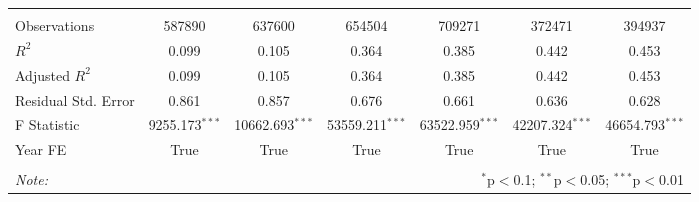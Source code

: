 \begin{tabular}{@{\extracolsep{5pt}}lcccccc}
\hline \\[-1.8ex]
 Observations & 587890 & 637600 & 654504 & 709271 & 372471 & 394937 \\
 $R^2$ & 0.099 & 0.105 & 0.364 & 0.385 & 0.442 & 0.453 \\
 Adjusted $R^2$ & 0.099 & 0.105 & 0.364 & 0.385 & 0.442 & 0.453 \\
 Residual Std. Error & 0.861  & 0.857  & 0.676  & 0.661  & 0.636  & 0.628  \\
 F Statistic & 9255.173$^{***}$  & 10662.693$^{***}$  & 53559.211$^{***}$  & 63522.959$^{***}$  & 42207.324$^{***}$  & 46654.793$^{***}$  \\
    Year FE & True & True & True & True & True & True \\
\hline
\hline \\[-1.8ex]
\textit{Note:} & \multicolumn{6}{r}{$^{*}$p$<$0.1; $^{**}$p$<$0.05; $^{***}$p$<$0.01} \\
\end{tabular}
